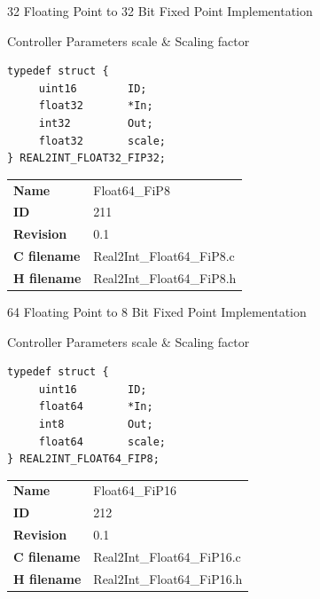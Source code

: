 32 Floating Point to 32 Bit Fixed Point Implementation

\begin{XtoCtabular}{Controller Parameters}
scale & Scaling factor\tabularnewline
\hline
\end{XtoCtabular}

\begin{lstlisting}
typedef struct {
     uint16        ID;
     float32       *In;
     int32         Out;
     float32       scale;
} REAL2INT_FLOAT32_FIP32;
\end{lstlisting}

\ifdefined \AddTestReports
{}
\fi
{}
\nopagebreak[0]
\begin{tabular}{l l}
\textbf{Name} & Float64\_FiP8 \tabularnewline
\textbf{ID} & 211 \tabularnewline
\textbf{Revision} & 0.1 \tabularnewline
\textbf{C filename} & Real2Int\_Float64\_FiP8.c \tabularnewline
\textbf{H filename} & Real2Int\_Float64\_FiP8.h \tabularnewline
\end{tabular}
\vspace{1ex}

64 Floating Point to 8 Bit Fixed Point Implementation

\begin{XtoCtabular}{Controller Parameters}
scale & Scaling factor\tabularnewline
\hline
\end{XtoCtabular}

\begin{lstlisting}
typedef struct {
     uint16        ID;
     float64       *In;
     int8          Out;
     float64       scale;
} REAL2INT_FLOAT64_FIP8;
\end{lstlisting}

\ifdefined \AddTestReports
{}
\fi
{}
\nopagebreak[0]
\begin{tabular}{l l}
\textbf{Name} & Float64\_FiP16 \tabularnewline
\textbf{ID} & 212 \tabularnewline
\textbf{Revision} & 0.1 \tabularnewline
\textbf{C filename} & Real2Int\_Float64\_FiP16.c \tabularnewline
\textbf{H filename} & Real2Int\_Float64\_FiP16.h \tabularnewline
\end{tabular}
\vspace{1ex}

